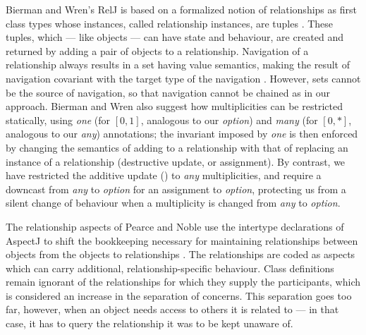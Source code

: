 {Bierman and Wren's RelJ is based on a formalized notion of relationships
as first class types whose instances, called relationship instances, are
tuples \cite{ref3}. These tuples, which --- like objects --- can have state
and behaviour, are created and returned by adding a pair of objects to a
relationship. Navigation of a relationship always results in a set having
value semantics, making the result of navigation covariant with the target
type of the navigation \cite{ref3}. However, sets cannot be the source of
navigation, so that navigation cannot be chained as in our approach. Bierman
and Wren also suggest how multiplicities can be restricted statically, using
\emph{one} (for $[0,1]$, analogous to our \emph{option}) and \emph{many}
(for $[0,*]$, analogous to our \emph{any}) annotations; the invariant imposed
by \emph{one} is then enforced by changing the semantics of adding to a
relationship with that of replacing an instance of a relationship
(destructive update, or assignment). By contrast, we have restricted the
additive update (\inline{+=}) to \emph{any} multiplicities, and require a
downcast from \emph{any} to \emph{option} for an assignment to
\emph{option}, protecting us from a silent change of behaviour when a
multiplicity is changed from \emph{any} to \emph{option}.

The relationship aspects of Pearce and Noble use the intertype
declarations of AspectJ to shift the bookkeeping necessary for maintaining
relationships between objects from the objects to relationships \cite{ref33}. The
relationships are coded as aspects which can carry additional,
relationship-specific behaviour. Class definitions remain ignorant of the
relationships for which they supply the participants, which is considered an
increase in the separation of concerns. This separation goes too far,
however, when an object needs access to others it is related to --- in that
case, it has to query the relationship it was to be kept unaware of.

}
